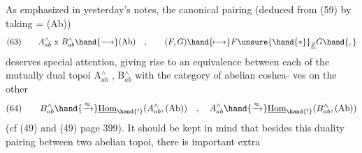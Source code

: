 As emphasized in yesterday's notes,  the canonical pairing (deduced
from (59)  by taking = (Ab))
\[ (63)\qquad A^{\wedge}_{ab} \text{ x } B^{\wedge}_{ab} \hand{\longrightarrow} (\text{Ab}) \quad , \qquad (F,G) \hand{\longmapsto} F \unsure{\hand{*}}_{\underline{Z}} G \hand{,} \]
deserves special attention,  giving rise to an equivalence between each
of the mutually dual  topoi A$^{\wedge}_{ab}$ , B$^{\wedge}_{ab}$  with the category of abelian coshea-%
ves on the other
\[ (64)\qquad B^{\wedge}_{ab} \hand{\xrightarrow{\approx}} \underline{\text{Hom}}_{\hand{!}}(A^{\wedge}_{ab},(\text{Ab})) \quad , \quad A^{\wedge}_{ab} \hand{\xrightarrow{\approx}} \underline{\text{Hom}}_{\hand{!}}(B^{\wedge}_{ab},(\text{Ab})) \]
(cf (49) and (49)  page 399).  It should be kept in mind that besides
this duality pairing between two abelian topoi,  there is important extra

